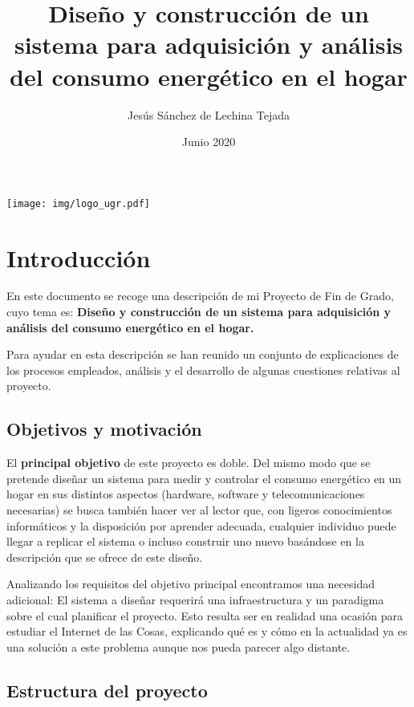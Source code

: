 \documentclass[a4paper,10pt]{article}
\title{Diseño y construcción de un sistema para adquisición y análisis
  del consumo energético en el hogar}
\author{Jesús Sánchez de Lechina Tejada}
\date{Junio 2020}
\begin{document}
\maketitle
\thispagestyle{empty}
\begin{center}
  \texttt{[image: img/logo\_ugr.pdf]}
\end{center}

\newpage

\tableofcontents

\fontsize{12}{16}\selectfont

\newpage

\section{Introducción}\label{intro}

En este documento se recoge una descripción de mi Proyecto de Fin de
Grado, cuyo tema es: \textbf{Diseño y construcción de un sistema para
  adquisición y análisis del consumo energético en el hogar.}

Para ayudar en esta descripción se han reunido un conjunto de
explicaciones de los procesos empleados, análisis y el desarrollo de
algunas cuestiones relativas al proyecto.

\subsection{Objetivos y motivación}\label{objetivos}

El \textbf{principal objetivo} de este proyecto es doble. Del mismo modo que se
pretende diseñar un sistema para medir y controlar el consumo
energético en un hogar en sus distintos aspectos (hardware, software y
telecomunicaciones necesarias) se busca también hacer ver al lector
que, con ligeros conocimientos informáticos y la disposición por
aprender adecuada, cualquier individuo puede llegar a replicar el
sistema o incluso construir uno nuevo basándose en la descripción que
se ofrece de este diseño.

Analizando los requisitos del objetivo principal encontramos una
necesidad adicional: El sistema a diseñar requerirá una
infraestructura y un paradigma sobre el cual planificar el
proyecto. Esto resulta ser en realidad una ocasión para estudiar el
Internet de las Cosas, explicando qué es y cómo en la actualidad ya es
una solución a este problema aunque nos pueda parecer algo distante.

\subsection{Estructura del proyecto}\label{estructura}
\end{document}
